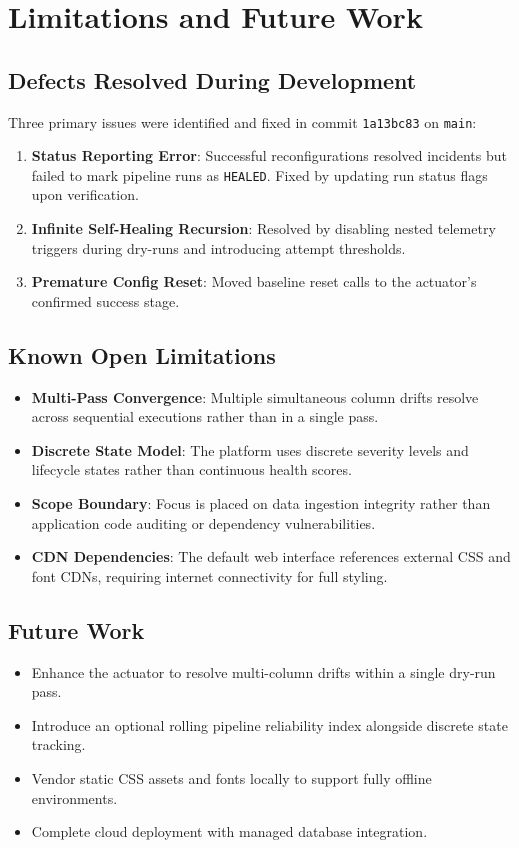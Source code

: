 \documentclass[11pt]{article}
\newcommand{\code}[1]{\texttt{\small #1}}
\begin{document}
\section{Limitations and Future Work}

\subsection{Defects Resolved During Development}
Three primary issues were identified and fixed in commit \code{1a13bc83} on \code{main}:
\begin{enumerate}
  \item \textbf{Status Reporting Error}: Successful reconfigurations resolved incidents but failed to mark pipeline runs as \code{HEALED}. Fixed by updating run status flags upon verification.
  \item \textbf{Infinite Self-Healing Recursion}: Resolved by disabling nested telemetry triggers during dry-runs and introducing attempt thresholds.
  \item \textbf{Premature Config Reset}: Moved baseline reset calls to the actuator's confirmed success stage.
\end{enumerate}

\subsection{Known Open Limitations}
\begin{itemize}
  \item \textbf{Multi-Pass Convergence}: Multiple simultaneous column drifts resolve across sequential executions rather than in a single pass.
  \item \textbf{Discrete State Model}: The platform uses discrete severity levels and lifecycle states rather than continuous health scores.
  \item \textbf{Scope Boundary}: Focus is placed on data ingestion integrity rather than application code auditing or dependency vulnerabilities.
  \item \textbf{CDN Dependencies}: The default web interface references external CSS and font CDNs, requiring internet connectivity for full styling.
\end{itemize}

\subsection{Future Work}
\begin{itemize}
  \item Enhance the actuator to resolve multi-column drifts within a single dry-run pass.
  \item Introduce an optional rolling pipeline reliability index alongside discrete state tracking.
  \item Vendor static CSS assets and fonts locally to support fully offline environments.
  \item Complete cloud deployment with managed database integration.
\end{itemize}
\end{document}
